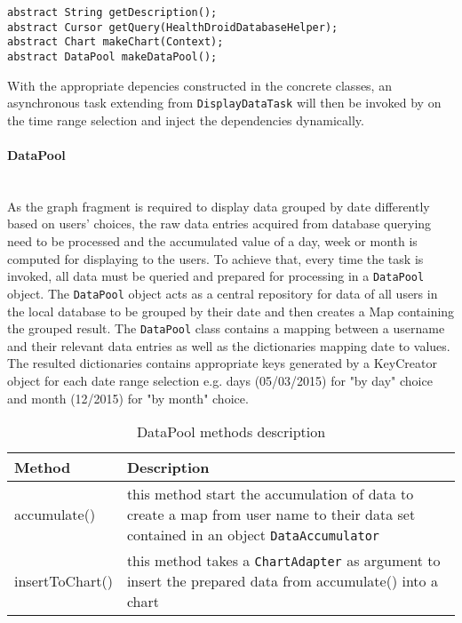 \begin{lstlisting}
abstract String getDescription();
abstract Cursor getQuery(HealthDroidDatabaseHelper);
abstract Chart makeChart(Context);
abstract DataPool makeDataPool();
\end{lstlisting}

With the appropriate depencies constructed in the concrete classes, an asynchronous task extending from
\texttt{DisplayDataTask} will then be invoked by on the time range selection and inject the dependencies dynamically.

\paragraph{DataPool}\mbox{} \\
As the graph fragment is required to display data grouped by date differently based on users' choices, the raw data
entries acquired from database querying need to be processed and the accumulated value of a day, week or month is
computed for displaying to the users. To achieve that, every time the task is invoked, all data must be queried and
prepared for processing in a \texttt{DataPool} object. The \texttt{DataPool} object acts as a central repository for
data of all users in the local database to be grouped by their date and then creates a Map containing the grouped
result. The \texttt{DataPool} class contains a mapping between a username and their relevant data entries as well as the
dictionaries mapping date to values. The resulted dictionaries contains appropriate keys generated by a KeyCreator
object for each date range selection e.g. days (05/03/2015) for "by day" choice and month (12/2015) for "by month"
choice.

\begin{table}
\begin{center}
    \begin{tabularx}{\textwidth}{| l | X |}
        \hline Method & Description \\
        \hline accumulate() & 
            this method start the accumulation of data to create a map from user name to their data set contained in an
            object \texttt{DataAccumulator} \\
        \hline insertToChart() &
            this method takes a \texttt{ChartAdapter} as argument to insert the prepared data from accumulate() into a
            chart \\
        \hline
    \end{tabularx}
\end{center}
\caption{DataPool methods description}
\end{table}

